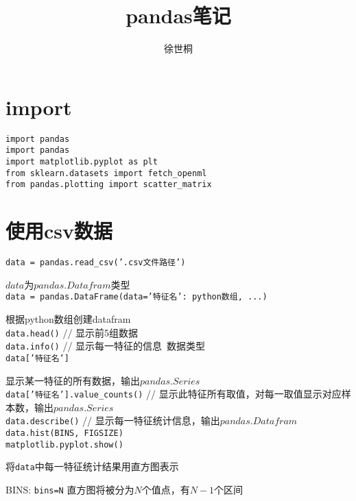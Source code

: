 \documentclass[UTF8]{ctexart}
\title{pandas笔记}
\author{徐世桐}
\date{}
\begin{document}
\maketitle

\section{import}
\noindent \texttt{import pandas}\\
\texttt{import pandas}\\
\texttt{import matplotlib.pyplot as plt}\\
\texttt{from sklearn.datasets import fetch\_openml}\\
\texttt{from pandas.plotting import scatter\_matrix}
\section{使用csv数据}
\noindent \texttt{data = pandas.read\_csv('.csv文件路径')}

  $data$为$pandas.Datafram$类型\\
\texttt{data = pandas.DataFrame(data={'特征名': python数组, ...})}

   根据python数组创建datafram\\
\texttt{data.head()} // 显示前5组数据\\
\texttt{data.info()} // 显示每一特征的信息\ 数据类型\\
\texttt{data['特征名']} 
  
  显示某一特征的所有数据，输出$pandas.Series$\\
\texttt{data['特征名'].value\_counts()} // 显示此特征所有取值，对每一取值显示对应样本数，输出$pandas.Series$\\
\texttt{data.describe()} // 显示每一特征统计信息，输出$pandas.Datafram$\\
\texttt{data.hist(BINS, FIGSIZE)}\\
\texttt{matplotlib.pyplot.show()}

  将\texttt{data}中每一特征统计结果用直方图表示

  BINS: \texttt{bins=N} 直方图将被分为$N$个值点，有$N-1$个区间
\end{document}
